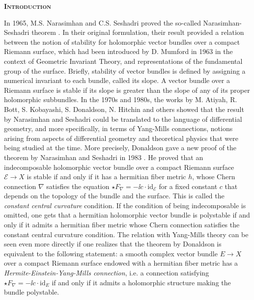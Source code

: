 {}
\begin{center}
    {\scshape\bfseries\Large Introduction}
\end{center}
\thispagestyle{introduction}
In 1965, M.S. Narasimhan and C.S. Seshadri proved the so-called Narasimhan-Seshadri theorem \parencite{NS1965}. In their original formulation, their result provided a relation between the notion of stability for holomorphic vector bundles over a compact Riemann surface, which had been introduced by D. Mumford in 1963 in the context of Geometric Invariant Theory, and representations of the fundamental group of the surface. Briefly, stability of vector bundles is defined by assigning a numerical invariant to each bundle, called its slope. A vector bundle over a Riemann surface is stable if its slope is greater than the slope of any of its proper holomorphic subbundles. In the 1970s and 1980s, the works by M. Atiyah, R. Bott, S. Kobayashi, S. Donaldson, N. Hitchin and others showed that the result by Narasimhan and Seshadri could be translated to the language of differential geometry, and more specifically, in terms of Yang-Mills connections, notions arising from aspects of differential geometry and theoretical physics that were being studied at the time. More precisely, Donaldson gave a new proof of the theorem by Narasimhan and Seshadri in 1983 \parencite{DonaldsonNS83}. He proved that an indecomposable holomorphic vector bundle over a compact Riemann surface \(\mathcal{E} \to X\) is stable if and only if it has a hermitian fiber metric \(h\), whose Chern connection \(\nabla\) satisfies the equation \(\star F_\nabla=-\ii c \cdot \mathrm{id}_{\mathcal{E}}\) for a fixed constant \(c\) that depends on the topology of the bundle and the surface. This is called the \textit{constant central curvature} condition. If the condition of being indecomposable is omitted, one gets that a hermitian holomorphic vector bundle is polystable if and only if it admits a hermitian fiber metric whose Chern connection satisfies the constant central curvature condition. The relation with Yang-Mills theory can be seen even more directly if one realizes that the theorem by Donaldson is equivalent to the following statement: a smooth complex vector bundle \(E \to X\) over a compact Riemann surface endowed with a hermitian fiber metric has a \textit{Hermite-Einstein-Yang-Mills connection}, i.e. a connection satisfying \(\star F_\nabla=-\ii c \cdot \mathrm{id}_E\) if and only if it admits a holomorphic structure making the bundle polystable.    


